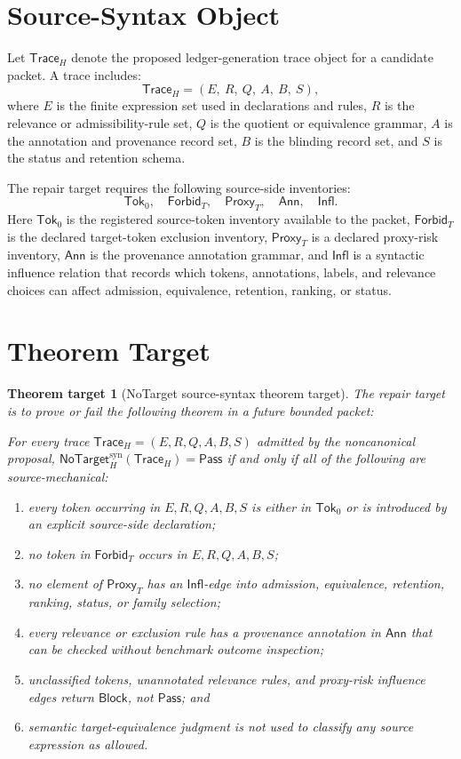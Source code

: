 \documentclass[11pt]{article}
\newcommand{\NoTargetSyn}{\mathsf{NoTarget}_{H}^{\mathrm{syn}}}
\newcommand{\SrcTok}{\mathsf{Tok}_{0}}
\newcommand{\ForbidT}{\mathsf{Forbid}_{T}}
\newcommand{\ProxyT}{\mathsf{Proxy}_{T}}
\newcommand{\TraceH}{\mathsf{Trace}_{H}}
\newcommand{\Annot}{\mathsf{Ann}}
\newcommand{\Influence}{\mathsf{Infl}}
\newcommand{\Pass}{\mathsf{Pass}}
\newcommand{\Block}{\mathsf{Block}}
\newtheorem{target}{Theorem target}
\begin{document}
\section{Source-Syntax Object}

Let \(\TraceH\) denote the proposed ledger-generation trace object for a
candidate packet. A trace includes:
\[
    \TraceH =
    (E,\ R,\ Q,\ A,\ B,\ S),
\]
where \(E\) is the finite expression set used in declarations and rules,
\(R\) is the relevance or admissibility-rule set, \(Q\) is the quotient or
equivalence grammar, \(A\) is the annotation and provenance record set,
\(B\) is the blinding record set, and \(S\) is the status and retention
schema.

The repair target requires the following source-side inventories:
\[
    \SrcTok,\quad \ForbidT,\quad \ProxyT,\quad \Annot,\quad \Influence.
\]
Here \(\SrcTok\) is the registered source-token inventory available to the
packet, \(\ForbidT\) is the declared target-token exclusion inventory,
\(\ProxyT\) is a declared proxy-risk inventory, \(\Annot\) is the
provenance annotation grammar, and \(\Influence\) is a syntactic influence
relation that records which tokens, annotations, labels, and relevance
choices can affect admission, equivalence, retention, ranking, or status.

\section{Theorem Target}

\begin{target}[NoTarget source-syntax theorem target]
The repair target is to prove or fail the following theorem in a future
bounded packet:

For every trace \(\TraceH=(E,R,Q,A,B,S)\) admitted by the noncanonical
proposal, \(\NoTargetSyn(\TraceH)=\Pass\) if and only if all of the
following are source-mechanical:
\begin{enumerate}
    \item every token occurring in \(E,R,Q,A,B,S\) is either in
    \(\SrcTok\) or is introduced by an explicit source-side declaration;
    \item no token in \(\ForbidT\) occurs in \(E,R,Q,A,B,S\);
    \item no element of \(\ProxyT\) has an \(\Influence\)-edge into
    admission, equivalence, retention, ranking, status, or family selection;
    \item every relevance or exclusion rule has a provenance annotation in
    \(\Annot\) that can be checked without benchmark outcome inspection;
    \item unclassified tokens, unannotated relevance rules, and proxy-risk
    influence edges return \(\Block\), not \(\Pass\); and
    \item semantic target-equivalence judgment is not used to classify any
    source expression as allowed.
\end{enumerate}
\end{target}
\end{document}
